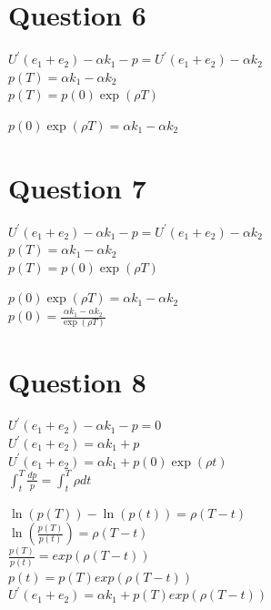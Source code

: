 \documentclass[12pt]{article}
\numberwithin{equation}{subsection} %
\begin{document}
\section{Question 6}
$U^{\prime}(e_{1}+e_{2})-\alpha k_{1}-p= U^{\prime}(e_{1}+e_{2})-\alpha k_{2}$\\

$p(T)=\alpha k_{1}-\alpha k_{2}$\\
$p(T)=p(0)\exp(\rho T)$

$p(0)\exp(\rho T)=\alpha k_{1}-\alpha k_{2}$\\



\section{Question 7}
$U^{\prime}(e_{1}+e_{2})-\alpha k_{1}-p= U^{\prime}(e_{1}+e_{2})-\alpha k_{2}$\\

$p(T)=\alpha k_{1}-\alpha k_{2}$\\
$p(T)=p(0)\exp(\rho T)$

$p(0)\exp(\rho T)=\alpha k_{1}-\alpha k_{2}$\\

$p(0)=\frac{\alpha k_{1}-\alpha k_{2}}{\exp(\rho T)}$

\section{Question 8}
$U^{\prime}(e_{1}+e_{2})-\alpha k_{1}-p=0$\\

$U^{\prime}(e_{1}+e_{2})=\alpha k_{1}+p$\\

$U^{\prime}(e_{1}+e_{2})=\alpha k_{1}+p(0)\exp(\rho t)$\\

$\int _{t}^{T}\frac{dp}{p}=\int_{t}^{T} \rho dt$

$\ln(p(T))-\ln(p(t))=\rho(T-t)$\\

$\ln \left( \frac{p(T)}{p(t)} \right)= \rho(T-t)$\\

$\frac{p(T)}{p(t)}=exp(\rho(T-t))$\\

$p(t)=p(T)exp(\rho(T-t))$\\

$U^{\prime}(e_{1}+e_{2})=\alpha k_{1}+p(T)exp(\rho(T-t))$\\
\end{document}
